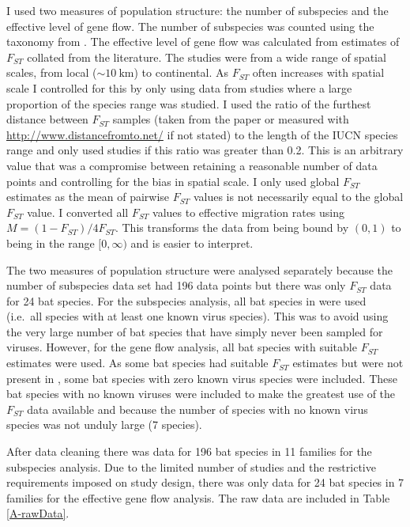 I used two measures of population structure: the number of subspecies and the effective level of gene flow.
The number of subspecies was counted using the taxonomy from \textcite{wilson2005mammal}.
The effective level of gene flow was calculated from estimates of $F_{ST}$ collated from the literature.
The studies were from a wide range of spatial scales, from local ($\sim\SI{10}{\kilo\metre}$) to continental.
As $F_{ST}$ often increases with spatial scale \cite{burland1999population, hulva2010mechanisms, o2015genetic, vonhof2015range} I controlled for this by only using data from studies where a large proportion of the species range was studied.
I used the ratio of the furthest distance between $F_{ST}$ samples (taken from the paper or measured with \url{http://www.distancefromto.net/} if not stated) to the length of the IUCN species range \cite{iucn} and only used studies if this ratio was greater than 0.2.
This is an arbitrary value that was a compromise between retaining a reasonable number of data points and controlling for the bias in spatial scale.
I only used global $F_{ST}$ estimates as the mean of pairwise $F_{ST}$ values is not necessarily equal to the global $F_{ST}$ value.
I converted all $F_{ST}$ values to effective migration rates using $M = (1-F_{ST})/4F_{ST}$.
This transforms the data from being bound by $(0, 1)$ to being in the range $\lbrack 0, \infty)$ and is easier to interpret. 

The two measures of population structure were analysed separately because the number of subspecies data set had 196 data points but there was only $F_{ST}$ data for 24 bat species.
For the subspecies analysis, all bat species in \textcite{luis2013comparison} were used (i.e.\ all species with at least one known virus species).
This was to avoid using the very large number of bat species that have simply never been sampled for viruses.
However, for the gene flow analysis, all bat species with suitable $F_{ST}$ estimates were used.
As some bat species had suitable $F_{ST}$ estimates but were not present in \textcite{luis2013comparison}, some bat species with zero known virus species were included. 
These bat species with no known viruses were included to make the greatest use of the $F_{ST}$ data available and because the number of species with no known virus species was not unduly large (7 species).

After data cleaning there was data for 196 bat species in 11 families for the subspecies analysis.
Due to the limited number of studies and the restrictive requirements imposed on study design, there was only data for 24 bat species in 7 families for the effective gene flow analysis.
The raw data are included in Table \ref{A-rawData}.




